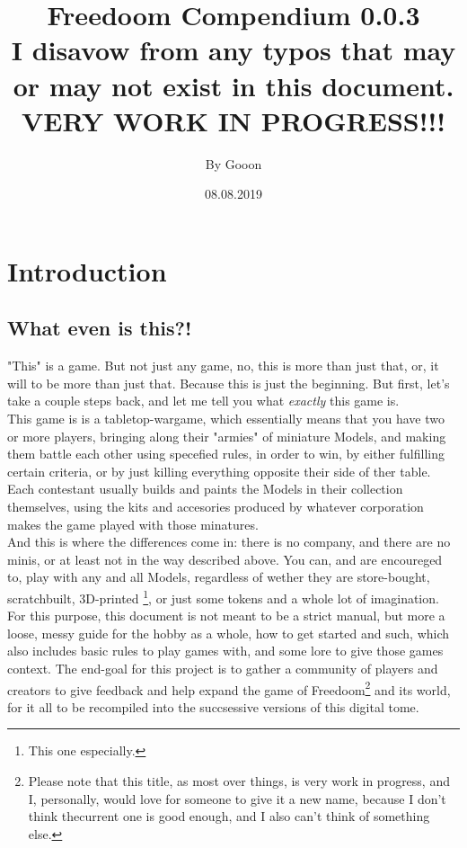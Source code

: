 \documentclass[a4paper,12pt]{book}
\begin{document}
\title{\Large{\textbf{Freedoom Compendium 0.0.3\\ I disavow from any typos that may or may not exist in this document.\\ VERY WORK IN PROGRESS!!!}}}
\author{By Gooon}
\date{08.08.2019}

\maketitle
\let\cleardoublepage\clearpage
\tableofcontents
\pagebreak

\chapter{Introduction}
\section{What even is this?!}
"This" is a game. But not just any game, no, this is more than just that, or,  it will to be more than just that. Because this is just the beginning. But first, let's take a couple steps back, and let me tell you what \textit{exactly} this game is. \\
This game is is a tabletop-wargame, which essentially means that you have two or more players, bringing along their "armies" of miniature Models, and making them battle each other using specefied rules, in order to win, by either fulfilling certain criteria, or by just killing everything opposite their side of ther table. Each contestant usually builds and paints the Models in their collection themselves, using the kits and accesories produced by whatever corporation makes the game played with those minatures. \\
And this is where the differences come in: there is no company, and there are no minis, or at least not in the way described above. You can, and are encoureged to, play with any and all Models, regardless of wether they are store-bought, scratchbuilt, 3D-printed \footnote{This one especially.}, or just some tokens and a whole lot of imagination. For this purpose, this document is not meant to be a strict manual, but more a loose, messy guide for the hobby as a whole, how to get started and such, which also includes basic rules to play games with, and some lore to give those games context. The end-goal for this project is to gather a community of players and creators to give feedback and help expand the game of Freedoom\footnote{Please note that this title, as most over things, is very work in progress, and I, personally, would love for someone to give it a new name, because I don't think thecurrent one is good enough, and I also can't think of something else.} and its world, for it all to be recompiled into the succsessive versions of this digital tome.
\end{document}
